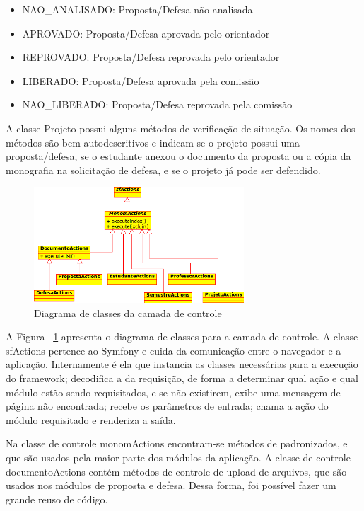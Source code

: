 \begin{itemize}
\item NAO\_ANALISADO: Proposta/Defesa não analisada
\item APROVADO: Proposta/Defesa aprovada pelo orientador
\item REPROVADO: Proposta/Defesa reprovada pelo orientador
\item LIBERADO: Proposta/Defesa aprovada pela comissão
\item NAO\_LIBERADO: Proposta/Defesa reprovada pela comissão
\end{itemize}

A classe Projeto possui alguns métodos de verificação de situação. Os nomes dos métodos são bem 
autodescritivos e indicam se o projeto possui uma proposta/defesa, se o estudante anexou o documento
da proposta ou a cópia da monografia na solicitação de defesa, e se o projeto já pode ser defendido.

\begin{figure}[htbp]
\centering
\includegraphics[width=0.7\textwidth]{fig/uml_controllers.png}
\caption{Diagrama de classes da camada de controle}
\label{fig:diag_controllers}
\end{figure}

A Figura ~\ref{fig:diag_controllers} apresenta o diagrama de classes para a camada de controle.
A classe sfActions pertence ao Symfony e cuida da comunicação entre o navegador e a aplicação. 
Internamente é ela que instancia as classes necessárias para a execução do framework; decodifica
a  da requisição, de forma a determinar qual ação e qual módulo estão 
sendo requisitados, e se não existirem, exibe uma mensagem de página não encontrada; recebe os
parâmetros de entrada; chama a ação do módulo requisitado e renderiza a saída. 

Na classe de controle monomActions encontram-se métodos de  
padronizados, e que são usados pela maior parte dos módulos da aplicação. A classe de controle
documentoActions contém métodos de controle de upload de arquivos, que são usados nos módulos de 
proposta e defesa. Dessa forma, foi possível fazer um grande reuso de código.


